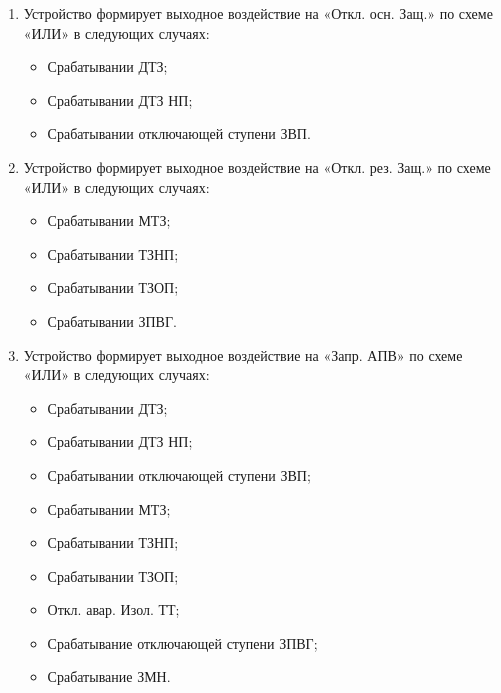 \color{black}

\begin{enumerate}[label=\arabic{section}.\arabic{subsection}.\arabic{enumi}, labelsep=4pt, leftmargin=0pt, itemindent=57pt, itemsep=0pt, parsep=0pt] %


\item
Устройство формирует выходное воздействие на  «Откл. осн. Защ.» по схеме «ИЛИ» в следующих 
случаях: 

\begin{itemize}
    \item Срабатывании ДТЗ;  
    \item Срабатывании ДТЗ НП;
    \item Срабатывании отключающей ступени ЗВП. 
\end{itemize}

\item
Устройство формирует выходное воздействие на  «Откл. рез. Защ.» по схеме «ИЛИ» в следующих 
случаях: 

\begin{itemize}
    \item Срабатывании МТЗ; 
    \item Срабатывании ТЗНП; 
    \item Срабатывании ТЗОП;
    \item Срабатывании ЗПВГ.
\end{itemize}

\item
Устройство формирует выходное воздействие на «Запр. АПВ» по схеме «ИЛИ» в следующих 
случаях: 

\begin{itemize}
    \item Срабатывании ДТЗ;
    \item Срабатывании ДТЗ НП; 
    \item Срабатывании отключающей ступени ЗВП;
    \item Срабатывании МТЗ;
    \item Срабатывании ТЗНП;
    \item Срабатывании ТЗОП;
    \item Откл. авар. Изол. ТТ;
    \item Срабатывание отключающей ступени ЗПВГ; 
    \item Срабатывание ЗМН. 
\end{itemize}


\end{enumerate}
